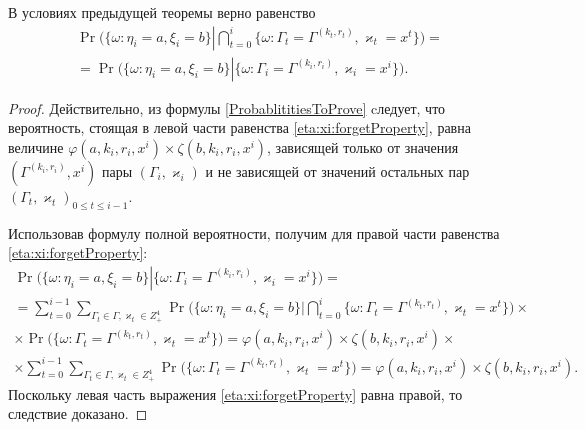 \documentclass{report}
\begin{document}
\begin{corollary}\label{eta:xi:forget}
В условиях предыдущей теоремы верно равенство
\begin{multline}
\Pr \biggl(\{ \omega \colon \eta_i = a, \xi_i=b\} \left|\bigcap_{t=0}^{i}\{\omega\colon \Gamma_t=\Gamma^{(k_t,r_t)}, \varkappa_t=x^t\}\right.\biggr)=\\
=\Pr \biggl(\{ \omega \colon \eta_i = a, \xi_i=b\} \left|\{\omega\colon \Gamma_i=\Gamma^{(k_i,r_i)}, \varkappa_i=x^i\}\right.\biggr).
\label{eta:xi:forgetProperty}
\end{multline}
\end{corollary}
\begin{proof}
Действительно, из формулы \eqref{ProbablititiesToProve} cледует, что вероятность, стоящая в левой части равенства \eqref{eta:xi:forgetProperty}, равна величине $\varphi(a,k_i,r_i,x^i)\times \zeta(b,k_i,r_i,x^i)$, зависящей только от значения $(\Gamma^{(k_i,r_i)},x^i)$ пары $(\Gamma_i,\varkappa_i)$ и не зависящей от значений остальных пар $(\Gamma_t,\varkappa_t)_{0\leqslant t \leqslant i-1}$. 

Использовав формулу полной вероятности, получим для правой части равенства \eqref{eta:xi:forgetProperty}:
\begin{multline*}
 \Pr \biggl(\{ \omega \colon \eta_i = a, \xi_i=b\} \left|\{\omega\colon \Gamma_i=\Gamma^{(k_i,r_i)}, \varkappa_i=x^i\}\right.\biggr) = \\ = \sum_{t=0}^{i-1}\sum_{\Gamma_t\in \Gamma, \varkappa_t \in Z^4_+}\Pr \biggl(\{ \omega \colon \eta_i = a, \xi_i=b\} \biggl|\bigcap_{t=0}^{i}\{\omega\colon \Gamma_t=\Gamma^{(k_t,r_t)}, \varkappa_t=x^t\}\biggr) \times \\ \times \Pr \biggl(\{ \omega \colon  \Gamma_t=\Gamma^{(k_t,r_t)}, \varkappa_t=x^t\}\biggr) = 
 \varphi(a,k_i,r_i,x^i)\times \zeta(b,k_i,r_i,x^i) \times \\ \times \sum_{t=0}^{i-1}\sum_{\Gamma_t\in \Gamma, \varkappa_t \in Z^4_+}\Pr \biggl(\{ \omega \colon  \Gamma_t=\Gamma^{(k_t,r_t)}, \varkappa_t=x^t\}\biggr) =\varphi(a,k_i,r_i,x^i)\times \zeta(b,k_i,r_i,x^i).
\end{multline*}
Поскольку левая часть выражения \eqref{eta:xi:forgetProperty} равна правой, то следствие доказано. 
\end{proof}
\end{document}
